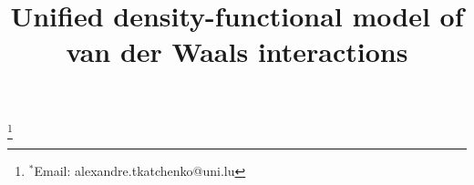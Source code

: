 

\title{Unified density-functional model of van der Waals interactions}




\begingroup
\renewcommand\thefootnote{}\footnote{$^*$Email: alexandre.tkatchenko@uni.lu}%
\addtocounter{footnote}{-1}%
\endgroup



\begingroup
\setlength\bibsep{0pt}
\renewcommand{\section}[2]{}
\footnotesize

\endgroup


